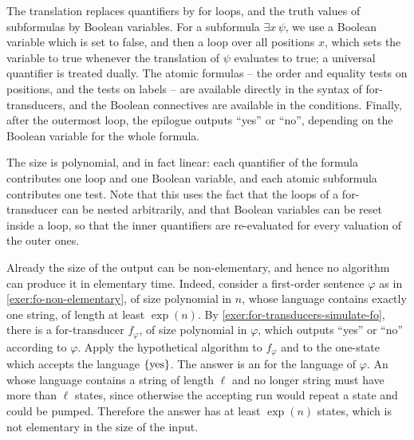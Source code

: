 \exerciseheader

{The translation replaces quantifiers by for loops, and the truth values of subformulas by Boolean variables. For a subformula $\exists x\, \psi$, we use a Boolean variable which is set to false, and then a loop over all positions $x$, which sets the variable to true whenever the translation of $\psi$ evaluates to true; a universal quantifier is treated dually. The atomic formulas -- the order and equality tests on positions, and the tests on labels -- are available directly in the syntax of for-transducers, and the Boolean connectives are available in the conditions. Finally, after the outermost loop, the epilogue outputs ``yes'' or ``no'', depending on the Boolean variable for the whole formula.

The size is polynomial, and in fact linear: each quantifier of the formula contributes one loop and one Boolean variable, and each atomic subformula contributes one test. Note that this uses the fact that the loops of a for-transducer can be nested arbitrarily, and that Boolean variables can be reset inside a loop, so that the inner quantifiers are re-evaluated for every valuation of the outer ones.
}

 {
Already the size of the output \nfa can be non-elementary, and hence no algorithm can produce it in elementary time. Indeed, consider a first-order sentence $\varphi$ as in \cref{exer:fo-non-elementary}, of size polynomial in $n$, whose language contains exactly one string, of length at least $\exp(n)$. By \cref{exer:for-transducers-simulate-fo}, there is a for-transducer $f_\varphi$, of size polynomial in $\varphi$, which outputs ``yes'' or ``no'' according to $\varphi$. Apply the hypothetical algorithm to $f_\varphi$ and to the one-state \nfa which accepts the language $\{\text{yes}\}$. The answer is an \nfa for the language of $\varphi$. An \nfa whose language contains a string of length $\ell$ and no longer string must have more than $\ell$ states, since otherwise the accepting run would repeat a state and could be pumped. Therefore the answer has at least $\exp(n)$ states, which is not elementary in the size of the input.
}

